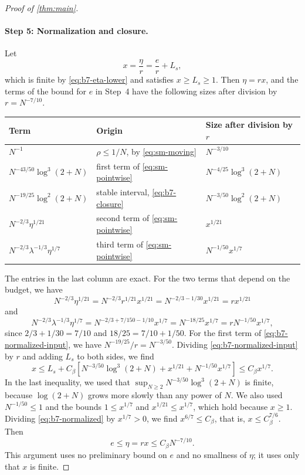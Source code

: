\begin{proof}[Proof of \cref{thm:main}]
\paragraph{Step 5: Normalization and closure.} Let
\[
 x=\frac\eta r=\frac er+L_s ,
\]
which is finite by \eqref{eq:b7-eta-lower} and satisfies $x\ge L_s\ge1$.
Then $\eta=rx$, and the terms of the bound for $e$ in Step~4 have the
following sizes after division by $r=N^{-7/10}$.
\begin{center}
\small
\begin{tabular}{@{}lll@{}}
\toprule
Term & Origin & Size after division by $r$\\
\midrule
$N^{-1}$ & $\rho\le1/N$, by \eqref{eq:sm-moving} & $N^{-3/10}$\\
$N^{-43/50}\log^3(2+N)$ & first term of \eqref{eq:sm-pointwise} &
$N^{-4/25}\log^3(2+N)$\\
$N^{-19/25}\log^2(2+N)$ & stable interval, \eqref{eq:b7-closure} &
$N^{-3/50}\log^2(2+N)$\\
$N^{-2/3}\eta^{1/21}$ & second term of \eqref{eq:sm-pointwise} & $x^{1/21}$\\
$N^{-2/3}\lambda^{-1/3}\eta^{1/7}$ & third term of \eqref{eq:sm-pointwise} & $N^{-1/50}x^{1/7}$\\
\bottomrule
\end{tabular}
\end{center}
The entries in the last column are exact. For the two terms that depend
on the budget, we have
\[
 N^{-2/3}\eta^{1/21}=N^{-2/3}r^{1/21}x^{1/21}
 =N^{-2/3-1/30}x^{1/21}=rx^{1/21}
\]
and
\[
 N^{-2/3}\lambda^{-1/3}\eta^{1/7}
 =N^{-2/3+7/150-1/10}x^{1/7}=N^{-18/25}x^{1/7}=rN^{-1/50}x^{1/7},
\]
since $2/3+1/30=7/10$ and $18/25=7/10+1/50$. For the first term of
\eqref{eq:b7-normalized-input}, we have $N^{-19/25}/r=N^{-3/50}$.
Dividing \eqref{eq:b7-normalized-input} by $r$ and adding $L_s$ to both
sides, we find
\begin{equation}\label{eq:b7-normalized}
 x\le L_s+C_\beta\left[
 N^{-3/50}\log^3(2+N)+x^{1/21}+N^{-1/50}x^{1/7}\right]
 \le C_\beta x^{1/7}.
\end{equation}
In the last inequality, we used that
$\sup_{N\ge2}N^{-3/50}\log^3(2+N)$ is finite, because $\log(2+N)$ grows
more slowly than any power of $N$. We also used $N^{-1/50}\le1$ and
the bounds $1\le x^{1/7}$ and $x^{1/21}\le x^{1/7}$, which hold because
$x\ge1$.
Dividing \eqref{eq:b7-normalized} by $x^{1/7}>0$, we find
$x^{6/7}\le C_\beta$, that is, $x\le C_\beta^{7/6}$. Then
\[
 e\le\eta=rx\le C_\beta N^{-7/10}.
\]
This argument uses no preliminary bound on $e$ and no smallness of
$\eta$; it uses only that $x$ is finite.


\end{proof}
